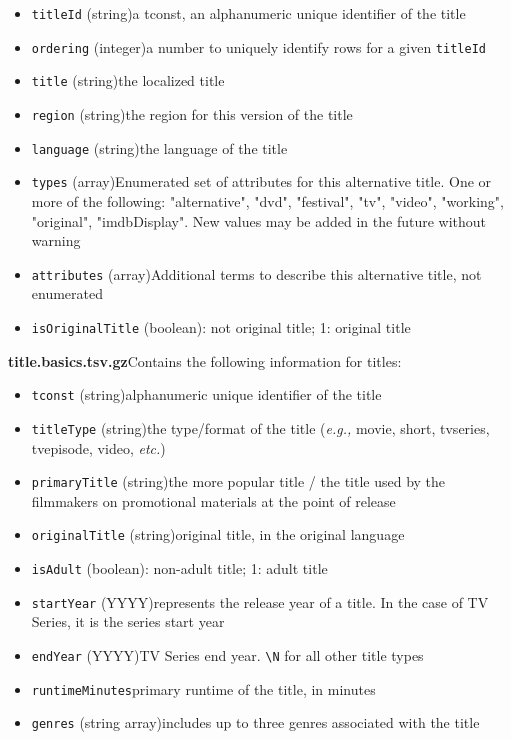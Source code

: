 \documentclass[11pt]{article}
\begin{document}
    \begin{itemize}
        \item \texttt{titleId} (string)\textemdash a tconst, an alphanumeric unique identifier of the title
        \item \texttt{ordering} (integer)\textemdash a number to uniquely identify rows for a given \texttt{titleId}
        \item \texttt{title} (string)\textemdash the localized title
        \item \texttt{region} (string)\textemdash the region for this version of the title
        \item \texttt{language} (string)\textemdash the language of the title
        \item \texttt{types} (array)\textemdash Enumerated set of attributes for this alternative title.
        One or more of the following: "alternative", "dvd", "festival", "tv", "video", "working", "original", "imdbDisplay".
        New values may be added in the future without warning
        \item \texttt{attributes} (array)\textemdash Additional terms to describe this alternative title, not enumerated
        \item \texttt{isOriginalTitle} (boolean): not original title;
        1: original title
    \end{itemize}

    \textbf{title.basics.tsv.gz}\textemdash Contains the following information for titles:

    \begin{itemize}
        \item \texttt{tconst} (string)\textemdash alphanumeric unique identifier of the title
        \item \texttt{titleType} (string)\textemdash the type/format of the title (\textit{e.g.,} movie, short, tvseries, tvepisode, video, \textit{etc.})
        \item \texttt{primaryTitle} (string)\textemdash the more popular title / the title used by the filmmakers on promotional materials at the point of release
        \item \texttt{originalTitle} (string)\textemdash original title, in the original language
        \item \texttt{isAdult} (boolean): non-adult title;
        1: adult title
        \item \texttt{startYear} (YYYY)\textemdash represents the release year of a title.
        In the case of TV Series, it is the series start year
        \item \texttt{endYear} (YYYY)\textemdash TV Series end year.
        \texttt{\textbackslash N} for all other title types
        \item \texttt{runtimeMinutes}\textemdash primary runtime of the title, in minutes
        \item \texttt{genres} (string array)\textemdash includes up to three genres associated with the title
    \end{itemize}
\end{document}
